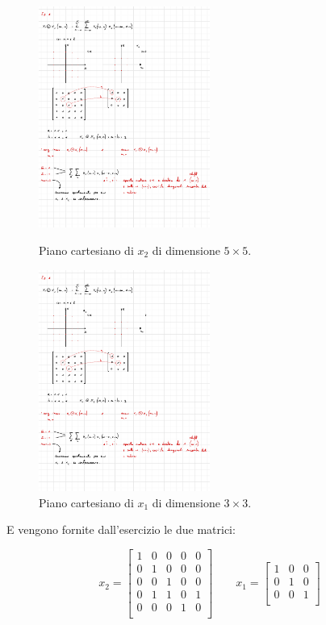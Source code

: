 \documentclass[a4paper]{article}
\begin{document}
	\begin{figure}[!htp]
		\centering
		\includegraphics[width=0.5\textwidth]{img/cross-correlazione-2D_ex1.pdf}
		\caption{Piano cartesiano di $x_{2}$ di dimensione $5 \times 5$.}
		\includegraphics[width=0.5\textwidth]{img/cross-correlazione-2D_ex1_1.pdf}
		\caption{Piano cartesiano di $x_{1}$ di dimensione $3 \times 3$.}
	\end{figure}

	\noindent
	E vengono fornite dall'esercizio le due matrici:
	
	\begin{equation*}
		x_{2} =
		\begin{bmatrix}
			1 & 0 & 0 & 0 & 0 \\
			0 & 1 & 0 & 0 & 0 \\
			0 & 0 & 1 & 0 & 0 \\
			0 & 1 & 1 & 0 & 1 \\
			0 & 0 & 0 & 1 & 0 \\
		\end{bmatrix}
		\hspace{2em}
		x_{1} =
		\begin{bmatrix}
			1 & 0 & 0 \\
			0 & 1 & 0 \\
			0 & 0 & 1 \\
		\end{bmatrix}		
	\end{equation*}
\end{document}
